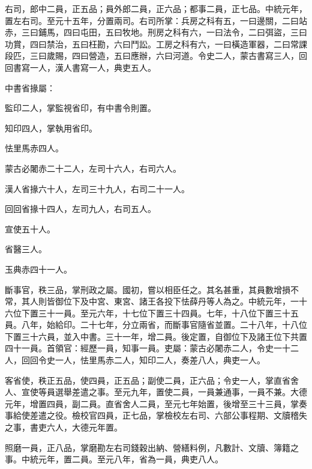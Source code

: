 \begin{pinyinscope}
 右司，郎中二員，正五品；員外郎二員，正六品；都事二員，正七品。中統元年，置左右司。至元十五年，分置兩司。右司所掌：兵房之科有五，一曰邊關，二曰站赤，三曰鋪馬，四曰屯田，五曰牧地。刑房之科有六，一曰法令，二曰弭盜，三曰功賞，四曰禁治，五曰枉勘，六曰鬥訟。工房之科有六，一曰橫造軍器，二曰常課段匹，三曰歲賜，四曰營造，五曰應辦，六曰河道。令史二人，蒙古書寫三人，回回書寫一人，漢人書寫一人，典吏五人。



 中書省掾屬：



 監印二人，掌監視省印，有中書令則置。



 知印四人，掌執用省印。



 怯里馬赤四人。



 蒙古必闍赤二十二人，左司十六人，右司六人。



 漢人省掾六十人，左司三十九人，右司二十一人。



 回回省掾十四人，左司九人，右司五人。



 宣使五十人。



 省醫三人。



 玉典赤四十一人。



 斷事官，秩三品，掌刑政之屬。國初，嘗以相臣任之。其名甚重，其員數增損不常，其人則皆御位下及中宮、東宮、諸王各投下怯薛丹等人為之。中統元年，一十六位下置三十一員。至元六年，十七位下置三十四員。七年，十八位下置三十五員。八年，始給印。二十七年，分立兩省，而斷事官隨省並置。二十八年，十八位下置三十六員，並入中書。三十一年，增二員。後定置，自御位下及諸王位下共置四十一員。首領官：經歷一員，知事一員。吏屬：蒙古必闍赤二人，令史一十二人，回回令史一人，怯里馬赤二人，知印二人，奏差八人，典吏一人。



 客省使，秩正五品，使四員，正五品；副使二員，正六品；令史一人，掌直省舍人、宣使等員選舉差遣之事。至元九年，置使二員，一員兼通事，一員不兼。大德元年，增置四員，副二員。直省舍人二員，至元七年始置，後增至三十三員，掌奏事給使差遣之役。檢校官四員，正七品，掌檢校左右司、六部公事程期、文牘稽失之事，書吏六人，大德元年置。



 照磨一員，正八品，掌磨勘左右司錢穀出納、營繕料例，凡數計、文牘、簿籍之事。中統元年，置二員。至元八年，省為一員，典吏八人。




\end{pinyinscope}
